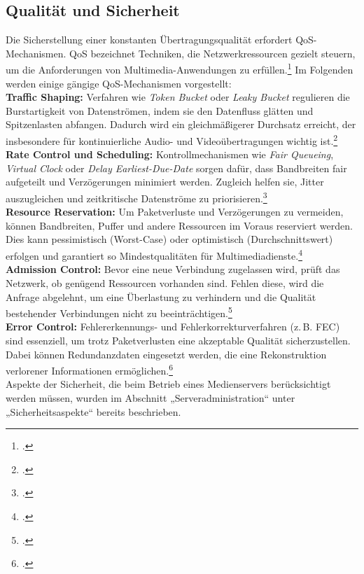 \documentclass[12pt,a4paper]{report}
\begin{document}
  \subsection{Qualität und Sicherheit}  
  Die Sicherstellung einer konstanten Übertragungsqualität erfordert \ac{QoS}-Mechanismen.  
  \ac{QoS} bezeichnet Techniken, die Netzwerkressourcen gezielt steuern, um die Anforderungen von Multimedia-Anwendungen zu erfüllen.\footcite[Vgl.][S.~9~ff.]{steinmetz_multimedia}  
  Im Folgenden werden einige gängige \ac{QoS}-Mechanismen vorgestellt: 
  \\
  \newline
  \textbf{Traffic Shaping:}  
  Verfahren wie \emph{Token Bucket} oder \emph{Leaky Bucket} regulieren die Burstartigkeit von Datenströmen, indem sie den Datenfluss glätten und Spitzenlasten abfangen.  
  Dadurch wird ein gleichmäßigerer Durchsatz erreicht, der insbesondere für kontinuierliche Audio- und Videoübertragungen wichtig ist.\footcite[Vgl.][S.~61~f.]{steinmetz_multimedia}  
  \\
  \newline
  \textbf{Rate Control und Scheduling:}  
  Kontrollmechanismen wie \emph{Fair Queueing}, \emph{Virtual Clock} oder \emph{Delay Earliest-Due-Date} sorgen dafür, 
  dass Bandbreiten fair aufgeteilt und Verzögerungen minimiert werden.  
  Zugleich helfen sie, Jitter auszugleichen und zeitkritische Datenströme zu priorisieren.\footcite[Vgl.][S.~62~f.]{steinmetz_multimedia}  
  \\
  \newline
  \textbf{Resource Reservation:}  
  Um Paketverluste und Verzögerungen zu vermeiden, können Bandbreiten, Puffer und andere Ressourcen im Voraus reserviert werden.  
  Dies kann pessimistisch (Worst-Case) oder optimistisch (Durchschnittswert) erfolgen und garantiert so Mindestqualitäten für Multimediadienste.\footcite[Vgl.][S.~52~f.]{steinmetz_multimedia}  
  \\
  \newline
  \textbf{Admission Control:}  
  Bevor eine neue Verbindung zugelassen wird, prüft das Netzwerk, ob genügend Ressourcen vorhanden sind.  
  Fehlen diese, wird die Anfrage abgelehnt, um eine Überlastung zu verhindern und die Qualität bestehender Verbindungen nicht zu beeinträchtigen.\footcite[Vgl.][S.~50~f.]{steinmetz_multimedia}  
  \\
  \newline
  \textbf{Error Control:}  
  Fehlererkennungs- und Fehlerkorrekturverfahren (z.\,B. \ac{FEC}) sind essenziell, 
  um trotz Paketverlusten eine akzeptable Qualität sicherzustellen.  
  Dabei können Redundanzdaten eingesetzt werden, die eine Rekonstruktion verlorener Informationen ermöglichen.\footcite[Vgl.][S.~68]{steinmetz_multimedia}  
  \\
  \newline  
  Aspekte der Sicherheit, die beim Betrieb eines Medienservers berücksichtigt werden müssen,
  wurden im Abschnitt „Serveradministration“ unter „Sicherheitsaspekte“ bereits beschrieben. 
    
\end{document}
